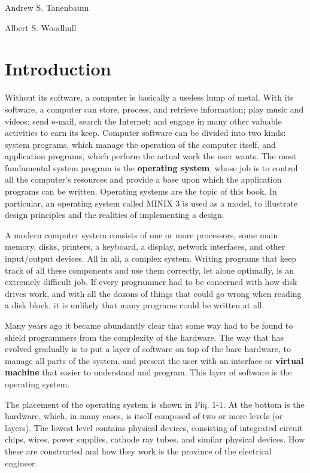 \documentclass{book}
\newcommand {\kw}  [1] {\textbf{#1}}
\begin{document}
Andrew S. Tanenbaum

Albert S. Woodhull


\mainmatter
\chapter{Introduction}
Without its software, a computer is basically a useless lump of metal.
With its software, a computer can store, process, and retrieve information; 
play music and videos; send e-mail, search the Internet; and engage in many other valuable activities to earn its keep.
Computer software can be divided into two kinds: system programs, which manage the operation of the computer itself, 
and application programs, which perform the actual work the user wants.
The most fundamental system program is the \kw{operating system}, whose job is to control all the computer's resources and 
provide a base upon which the application programs can be written.
Operating systems are the topic of this book.
In particular, an operating system called MINIX 3 is used as a model, to illustrate design principles and the realities of implementing a design.

A modern computer system consists of one or more processors, some main memory, disks, 
printers, a keyboard, a display, network interfaces, and other input/output devices. 
All in all, a complex system.
Writing programs that keep track of all these components and use them correctly, let alone optimally, is an extremely difficult job.
If every programmer had to be concerned with how disk drives work, and with all the dozons of things that could go wrong when reading a disk block, 
it is unlikely that many programs could be written at all.

Many years ago it became abundantly clear that some way had to be found to shield programmers from the complexity of the hardware.
The way that has evolved gradually is to put a layer of software on top of the bare hardware, 
to manage all parts of the system, and present the user with an interface or \kw{virtual machine} that easier to understand and program.
This layer of software is the operating system.

The placement of the operating system is shown in Fiq. 1-1.
At the bottom is the hardware, which, in many cases, is itself composed of two or more levels (or layers).
The lowest level contains physical devices, consisting of integrated circuit chips, wires, power supplies, cathode ray tubes, and similar physical devices.
How these are constructed and how they work is the province of the electrical engineer.
\end{document}

